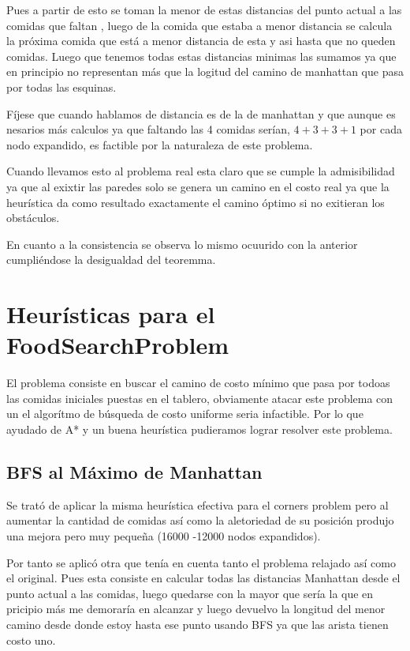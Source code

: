 \documentclass[a4paper,10pt,twocolumn]{article}
\begin{document}
Pues a partir de esto se toman la menor de estas distancias del punto actual a las comidas que faltan , luego de la comida que estaba a menor distancia se calcula  la próxima comida que está a menor distancia de esta y asi hasta que no queden comidas. Luego que tenemos todas estas distancias minimas las sumamos ya que en principio no representan más que la logitud del camino de manhattan que pasa por todas las esquinas.

Fíjese que cuando hablamos de distancia es de la de manhattan y que aunque es nesarios más calculos ya que faltando las 4 comidas serían, $4 + 3 + 3 + 1$ por cada nodo expandido,  es factible por la naturaleza de este problema.   

Cuando llevamos esto al problema real esta claro que se cumple la admisibilidad ya que al exixtir las paredes solo se genera un camino en el costo real ya que la heurística da como resultado exactamente el camino óptimo si no exitieran los obstáculos.

En cuanto a la consistencia se observa lo mismo ocuurido con la anterior cumpliéndose la desigualdad del teoremma. 
	
	

\section{Heurísticas para el FoodSearchProblem }\label{sec:dev}
El problema consiste en buscar el camino de costo mínimo que pasa por todoas las comidas iniciales puestas en el tablero, obviamente atacar este problema con un el algorítmo de búsqueda de costo uniforme seria infactible. Por lo que ayudado de A* y un buena heurística pudieramos lograr resolver este problema.




\subsection{BFS al Máximo de Manhattan}\label{sub:results}
Se trató de aplicar la misma heurística efectiva para el corners problem pero al aumentar la cantidad de comidas así como la aletoriedad de su posición produjo una mejora pero muy pequeña (16000 -12000 nodos expandidos).

Por tanto se aplicó otra que tenía en cuenta tanto el problema relajado así como el original. Pues esta consiste en calcular todas las distancias Manhattan desde el punto actual a las comidas, luego quedarse con la mayor que sería la que en pricipio más me demoraría en alcanzar y luego devuelvo la longitud del menor camino desde donde estoy hasta ese punto usando BFS ya que las arista tienen costo uno.
\end{document}
